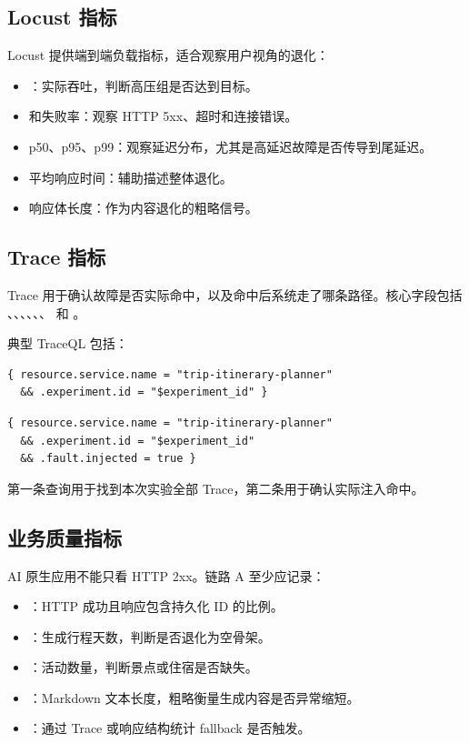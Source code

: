 \subsection{Locust 指标}

Locust 提供端到端负载指标，适合观察用户视角的退化：

\begin{itemize}
  \item {}：实际吞吐，判断高压组是否达到目标。
  \item {} 和失败率：观察 HTTP 5xx、超时和连接错误。
  \item p50、p95、p99：观察延迟分布，尤其是高延迟故障是否传导到尾延迟。
  \item 平均响应时间：辅助描述整体退化。
  \item 响应体长度：作为内容退化的粗略信号。
\end{itemize}

\subsection{Trace 指标}

Trace 用于确认故障是否实际命中，以及命中后系统走了哪条路径。核心字段包括 、、、、、、 和 。

典型 TraceQL 包括：

\begin{verbatim}
{ resource.service.name = "trip-itinerary-planner"
  && .experiment.id = "$experiment_id" }
\end{verbatim}

\begin{verbatim}
{ resource.service.name = "trip-itinerary-planner"
  && .experiment.id = "$experiment_id"
  && .fault.injected = true }
\end{verbatim}

第一条查询用于找到本次实验全部 Trace，第二条用于确认实际注入命中。

\subsection{业务质量指标}

AI 原生应用不能只看 HTTP 2xx。链路 A 至少应记录：

\begin{itemize}
  \item {}：HTTP 成功且响应包含持久化 ID 的比例。
  \item {}：生成行程天数，判断是否退化为空骨架。
  \item {}：活动数量，判断景点或住宿是否缺失。
  \item {}：Markdown 文本长度，粗略衡量生成内容是否异常缩短。
  \item {}：通过 Trace 或响应结构统计 fallback 是否触发。
\end{itemize}

